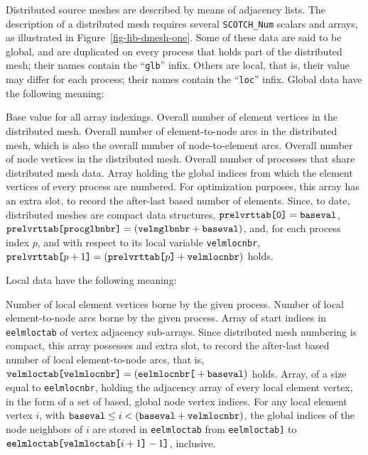 Distributed source meshes are described by means of adjacency
lists. The description of a distributed mesh requires several
\texttt{SCOTCH\_\lbt Num} scalars and arrays, as illustrated in
Figure~\ref{fig-lib-dmesh-one}.
Some of these data are said to be global, and are duplicated on every
process that holds part of the distributed mesh; their names contain
the ``{\tt glb}'' infix. Others are local, that is, their value may
differ for each process; their names contain the ``{\tt loc}''
infix. Global data have the following meaning:
\begin{itemize}
\iteme[{\tt baseval}]
Base value for all array indexings.
\iteme[{\tt velmglbnbr}]
Overall number of element vertices in the distributed mesh.
\iteme[{\tt eelmglbnbr}]
Overall number of element-to-node arcs in the distributed mesh, which
is also the overall number of node-to-element arcs.
\iteme[{\tt vnodglbnbr}]
Overall number of node vertices in the distributed mesh.
\iteme[{\tt procglbnbr}]
Overall number of processes that share distributed mesh data.
\iteme[{\tt prelvrttab}]
Array holding the global indices from which the element vertices of
every process are numbered. For optimization purposes, this array has
an extra slot, to record the after-last based number of
elements. Since, to date, distributed meshes are compact data
structures, $\mbox{\tt prel\lbt vrt\lbt tab[0]} = \mbox{\tt baseval}$,
$\mbox{\tt prel\lbt vrt\lbt tab[proc\lbt glb\lbt nbr]} =
(\mbox{\tt velm\lbt glb\lbt nbr} + \mbox{\tt baseval})$, and,
for each process index $p$, and with respect to its local
variable \texttt{velm\lbt loc\lbt nbr},
$\mbox{\tt prel\lbt vrt\lbt tab[}p + 1\mbox{\tt]} =
(\mbox{\tt prel\lbt vrt\lbt tab[}p\mbox{\tt]} +
\mbox{\tt velm\lbt loc\lbt nbr})$ holds.
\end{itemize}
Local data have the following meaning:
\begin{itemize}
\iteme[{\tt velmlocnbr}]
Number of local element vertices borne by the given process.
\iteme[{\tt eelmlocnbr}]
Number of local element-to-node arcs borne by the given process.
\iteme[{\tt velmloctab}]
Array of start indices in {\tt eelmloctab} of
vertex adjacency sub-arrays. Since distributed mesh numbering is
compact, this array possesses and extra slot, to record the after-last
based number of local element-to-node arcs, that is,
$\mbox{\tt velm\lbt loc\lbt tab[velm\lbt loc\lbt nbr]} =
(\mbox{\tt eelm\lbt loc\lbt nbr[} +
\mbox{\tt base\lbt val})$ holds.
\iteme[{\tt eelmloctab}]
Array, of a size equal to \texttt{eelm\lbt loc\lbt nbr}, holding
the adjacency array of every local element vertex, in the form of a
set of based, global node vertex indices. For any local element vertex
$i$, with $\mbox{\tt baseval} \leq i < (\mbox{\tt baseval} + \mbox{\tt
velm\lbt loc\lbt nbr})$, the global indices of the node neighbors
of $i$ are stored in \texttt{eelm\lbt loc\lbt tab}
from \texttt{eelm\lbt loc\lbt tab\lbt [velm\lbt loc\lbt tab[$i$]]} to
$\mbox{\tt eelm\lbt loc\lbt tab[velm\lbt loc\lbt tab[}i + 1\mbox{\tt ]} -
1\mbox{\tt ]}$, inclusive.
\end{itemize}

